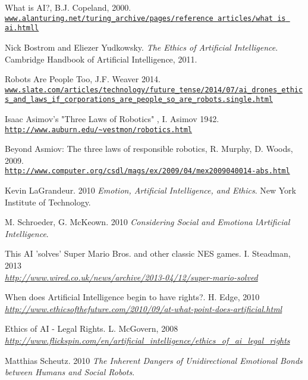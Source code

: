 \documentclass[article]{IEEEtran}
\begin{document}
\begin{thebibliography}{9}

What is AI?, B.J. Copeland, 2000.
\\\texttt{\url{www.alanturing.net/turing_archive/pages/reference articles/what is ai.htmll}}

Nick Bostrom and Eliezer Yudkowsky. 
\textit{The Ethics of Artificial Intelligence}. 
Cambridge Handbook of Artificial Intelligence, 2011.

Robots Are People Too, J.F. Weaver 2014.
\\\texttt{\url{www.slate.com/articles/technology/future_tense/2014/07/ai_drones_ethics_and_laws_if_corporations_are_people_so_are_robots.single.html}}

Isaac Asimov's "Three Laws of Robotics" , I. Asimov 1942.
\\\texttt{\url{http://www.auburn.edu/~vestmon/robotics.html}}

Beyond Asmiov: The three laws of responsible robotics, R. Murphy, D. Woods, 2009.
\\\texttt{\url{http://www.computer.org/csdl/mags/ex/2009/04/mex2009040014-abs.html}}

Kevin LaGrandeur. 2010
\textit{Emotion, Artificial Intelligence, and Ethics}. 
New York Institute of Technology.

M. Schroeder, G. McKeown. 2010
\textit{Considering Social and Emotiona lArtiﬁcial Intelligence}.

This AI 'solves' Super Mario Bros. and other classic NES games. I. Steadman, 2013
\\\textit{\url{ http://www.wired.co.uk/news/archive/2013-04/12/super-mario-solved}}

When does Artificial Intelligence begin to have rights?. H. Edge, 2010
\\\textit{\url{ http://www.ethicsofthefuture.com/2010/09/at-what-point-does-artificial.html}}

Ethics of AI - Legal Rights. L. McGovern, 2008
\\\textit{\url{http://www.flickspin.com/en/artificial_intelligence/ethics_of_ai_legal_rights}}

Matthias Scheutz. 2010
\textit{The Inherent Dangers of Unidirectional Emotional Bonds between Humans and Social Robots}. 


\end{thebibliography}
\end{document}
